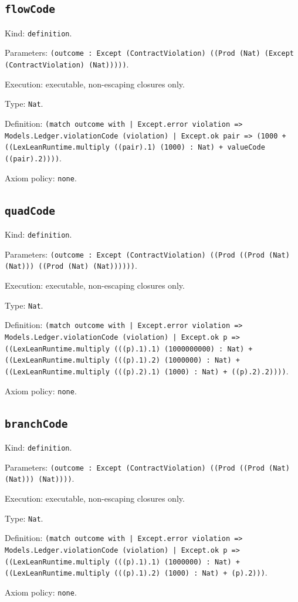 \documentclass[11pt]{article}
\begin{document}
\subsection*{\texttt{flowCode}}
\noindent Kind: \texttt{definition}.\par
\noindent Parameters: \texttt{(outcome : Except (ContractViolation) ((Prod (Nat) (Except (ContractViolation) (Nat)))))}.\par
\noindent Execution: executable, non-escaping closures only.\par
\noindent Type: \texttt{Nat}.\par
\noindent Definition: \texttt{(match outcome with | Except.error violation => Models.Ledger.violationCode (violation) | Except.ok pair => (1000 + ((LexLeanRuntime.multiply ((pair).1) (1000) : Nat) + valueCode ((pair).2))))}.\par
\noindent Axiom policy: \texttt{none}.\par
\subsection*{\texttt{quadCode}}
\noindent Kind: \texttt{definition}.\par
\noindent Parameters: \texttt{(outcome : Except (ContractViolation) ((Prod ((Prod (Nat) (Nat))) ((Prod (Nat) (Nat))))))}.\par
\noindent Execution: executable, non-escaping closures only.\par
\noindent Type: \texttt{Nat}.\par
\noindent Definition: \texttt{(match outcome with | Except.error violation => Models.Ledger.violationCode (violation) | Except.ok p => ((LexLeanRuntime.multiply (((p).1).1) (1000000000) : Nat) + ((LexLeanRuntime.multiply (((p).1).2) (1000000) : Nat) + ((LexLeanRuntime.multiply (((p).2).1) (1000) : Nat) + ((p).2).2))))}.\par
\noindent Axiom policy: \texttt{none}.\par
\subsection*{\texttt{branchCode}}
\noindent Kind: \texttt{definition}.\par
\noindent Parameters: \texttt{(outcome : Except (ContractViolation) ((Prod ((Prod (Nat) (Nat))) (Nat))))}.\par
\noindent Execution: executable, non-escaping closures only.\par
\noindent Type: \texttt{Nat}.\par
\noindent Definition: \texttt{(match outcome with | Except.error violation => Models.Ledger.violationCode (violation) | Except.ok p => ((LexLeanRuntime.multiply (((p).1).1) (1000000) : Nat) + ((LexLeanRuntime.multiply (((p).1).2) (1000) : Nat) + (p).2)))}.\par
\noindent Axiom policy: \texttt{none}.\par
\end{document}
